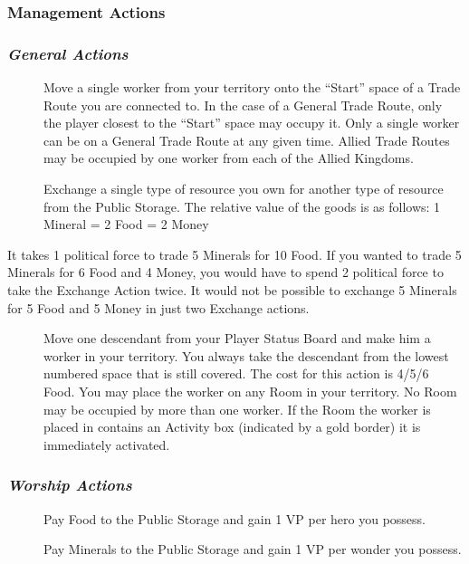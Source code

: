\documentclass[10pt,twocolumn]{article}
\begin{document}
\subsubsection{Management Actions}
\subsubsection*{\textit{General Actions}}
\begin{description}
\item[] Move a single worker from your territory onto the ``Start'' space of a Trade Route you are connected to. In the case of a General Trade Route, only the player closest to the ``Start'' space may occupy it. Only a single worker can be on a General Trade Route at any given time. Allied Trade Routes may be occupied by one worker from each of the Allied Kingdoms.

\item[] Exchange a single type of resource you own for another type of resource from the Public Storage. The relative value of the goods is as follows: 1 Mineral = 2 Food = 2 Money
\end{description}
\begin{BoxExample}It takes 1 political force to trade 5 Minerals for 10 Food. If you wanted to trade 5 Minerals for 6 Food and 4 Money, you would have to spend 2 political force to take the Exchange Action twice. It would not be possible to exchange 5 Minerals for 5 Food and 5 Money in just two Exchange actions.\end{BoxExample}
\begin{description}
\item[] Move one descendant from your Player Status Board and make him a worker in your territory. You always take the descendant from the lowest numbered space that is still covered. The cost for this action is {4/5/6} Food. You may place the worker on any Room in your territory. No Room may be occupied by more than one worker. If the Room the worker is placed in contains an Activity box (indicated by a gold border) it is immediately activated.
\end{description}

\subsubsection*{\textit{Worship Actions}}
\begin{description}
\item[] Pay  Food to the Public Storage and gain 1 VP per hero you possess.
\item[] Pay  Minerals to the Public Storage and gain 1 VP per wonder you possess.
\end{description}
\end{document}
